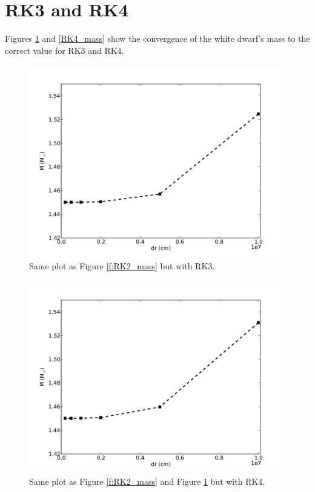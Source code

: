 \documentclass[12pt,preprint]{aastex}
\begin{document}
\section{RK3 and RK4}

Figures \ref{f:RK3_mass} and \ref{RK4_mass} show the convergence of the white dwarf's mass to the correct value for RK3 and RK4.

\begin{figure}[!ht]
\begin{center}
\includegraphics[width=5in]{RK3_mass.pdf}
\end{center}
\caption{Same plot as Figure \ref{f:RK2_mass} but with RK3. \label{f:RK3_mass}}
\end{figure}

\begin{figure}[!ht]
\begin{center}
\includegraphics[width=5in]{RK4_mass.pdf}
\end{center}
\caption{Same plot as Figure \ref{f:RK2_mass} and Figure \ref{f:RK3_mass} but with RK4.  \label{f:RK4_mass}}
\end{figure}


% 
%

%
\end{document}
